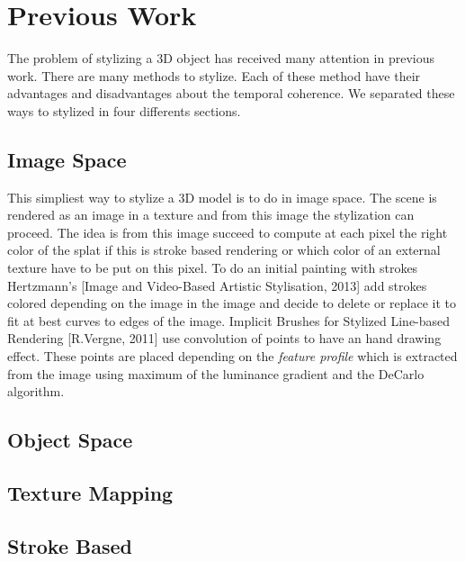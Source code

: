 \chapter{Previous Work}



The problem of stylizing a 3D object has received many attention in previous work. There are many methods to stylize. Each of these method have their advantages and disadvantages about the temporal coherence. We separated these ways to stylized in four differents sections.


\section{Image Space}

This simpliest way to stylize a 3D model is to do in image space. The scene is rendered as an image in a texture and from this image the stylization can proceed.
The idea is from this image succeed to compute at each pixel the right color of the splat if this is stroke based rendering or which color of an external texture have to be put on this pixel.
To do an initial painting with strokes Hertzmann's [Image and Video-Based Artistic Stylisation, 2013] add strokes colored depending on the image in the image and decide to delete or replace it to fit at best curves to edges of the image.
Implicit Brushes for Stylized Line-based Rendering [R.Vergne, 2011] use convolution of points to have an hand drawing effect. These points are placed depending on the \textit{feature profile} which is extracted from the image using maximum of the luminance gradient and the DeCarlo algorithm.
\section{Object Space}

\section{Texture Mapping}

\section{Stroke Based}
